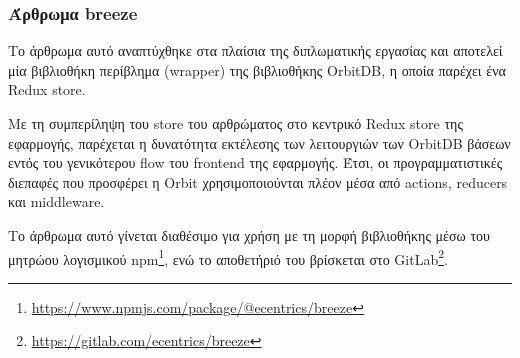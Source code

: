 \subsubsection{Άρθρωμα breeze} \label{subsubsection:4-3-1-breeze-unit}

Το άρθρωμα αυτό αναπτύχθηκε στα πλαίσια της διπλωματικής εργασίας και αποτελεί μία βιβλιοθήκη περίβλημα (wrapper) της βιβλιοθήκης OrbitDB, η οποία παρέχει ένα Redux store. 

Με τη συμπερίληψη του store του αρθρώματος στο κεντρικό Redux store της εφαρμογής, παρέχεται η δυνατότητα εκτέλεσης των λειτουργιών των OrbitDB βάσεων εντός του γενικότερου flow του frontend της εφαρμογής. Έτσι, οι προγραμματιστικές διεπαφές που προσφέρει η Orbit χρησιμοποιούνται πλέον μέσα από actions, reducers και middleware.

Το άρθρωμα αυτό γίνεται διαθέσιμο για χρήση με τη μορφή βιβλιοθήκης μέσω του μητρώου λογισμικού npm\footnote{\url{https://www.npmjs.com/package/@ecentrics/breeze}}, ενώ το αποθετήριό του βρίσκεται στο GitLab\footnote{\url{https://gitlab.com/ecentrics/breeze}}.
